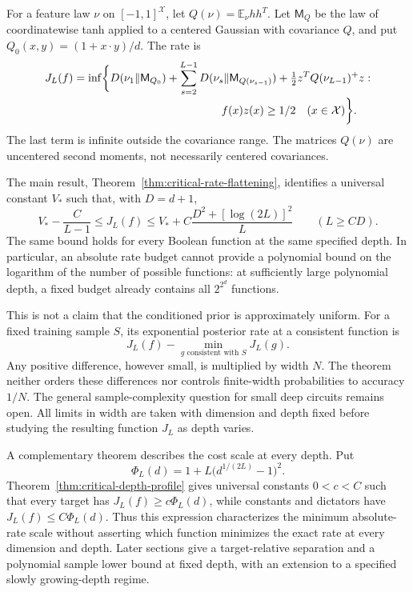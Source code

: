 \documentclass[11pt]{article}
\begin{document}
For a feature law $\nu$ on $[-1,1]^{\mathcal X}$, let
$Q(\nu)=\mathbb E_\nu hh^T$. Let $\mathsf M_Q$ be the law of
coordinatewise tanh applied to a centered Gaussian with covariance $Q$,
and put $Q_0(x,y)=(1+x\cdot y)/d$. The rate is
\[
\begin{split}
 J_L(f)=\inf\biggl\{&D(\nu_1\Vert\mathsf M_{Q_0})+
  \sum_{s=2}^{L-1}D(\nu_s\Vert\mathsf M_{Q(\nu_{s-1})})
  +\tfrac12 z^TQ(\nu_{L-1})^+z:\\[-2pt]
 &\hspace{35mm}f(x)z(x)\ge1/2\quad(x\in\mathcal X)\biggr\}.
\end{split}
\]
The last term is infinite outside the covariance range. The matrices
$Q(\nu)$ are uncentered second moments, not necessarily centered
covariances.

The main result, Theorem~\ref{thm:critical-rate-flattening}, identifies
a universal constant $V_*$ such that, with $D=d+1$,
\[
 V_*-\frac C{L-1}\le J_L(f)\le
 V_*+C\frac{D^2+[\log(2L)]^2}{L}
 \qquad(L\ge CD).
\]
The same bound holds for every Boolean function at the same specified
depth. In particular, an absolute rate budget cannot provide a
polynomial bound on the logarithm of the number of possible functions:
at sufficiently large polynomial depth, a fixed budget already contains
all $2^{2^d}$ functions.

This is not a claim that the conditioned prior is approximately uniform.
For a fixed training sample $S$, its exponential posterior rate at a
consistent function is
\[
 J_L(f)-\min_{g\text{ consistent with }S}J_L(g).
\]
Any positive difference, however small, is multiplied by width $N$.
The theorem neither orders these differences nor controls finite-width
probabilities to accuracy $1/N$. The general sample-complexity question
for small deep circuits remains open. All limits in width are taken
with dimension and depth fixed before studying the resulting function
$J_L$ as depth varies.

A complementary theorem describes the cost scale at every depth. Put
\[
 \Phi_L(d)=1+L\bigl(d^{1/(2L)}-1\bigr)^2.
\]
Theorem~\ref{thm:critical-depth-profile} gives universal constants
$0<c<C$ such that every target has $J_L(f)\ge c\Phi_L(d)$, while
constants and dictators have $J_L(f)\le C\Phi_L(d)$.
Thus this expression characterizes the minimum absolute-rate scale
without asserting which function minimizes the exact rate at every
dimension and depth. Later sections give a target-relative separation
and a polynomial sample lower bound at fixed depth, with an extension
to a specified slowly growing-depth regime.
\end{document}
